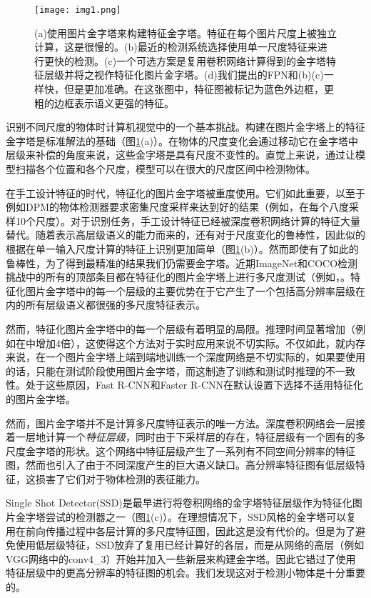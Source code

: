 \documentclass[../main.tex]{subfile}
\begin{document}
\begin{figure}[bh]
    \centering
    \texttt{[image: img1.png]}
    \caption{(a)使用图片金字塔来构建特征金字塔。特征在每个图片尺度上被独立计算，这是很慢的。(b)最近的检测系统选择使用单一尺度特征来进行更快的检测。(c)一个可选方案是复用卷积网络计算得到的金字塔特征层级并将之视作特征化图片金字塔。(d)我们提出的FPN和(b)(c)一样快，但是更加准确。在这张图中，特征图被标记为蓝色外边框，更粗的边框表示语义更强的特征。}
    \label{fig:img1}
\end{figure}


识别不同尺度的物体时计算机视觉中的一个基本挑战。构建在图片金字塔上的特征金字塔是标准解法的基础\cite{pyramid}（图\ref{fig:img1}(a)）。在物体的尺度变化会通过移动它在金字塔中层级来补偿的角度来说，这些金字塔是具有尺度不变性的。直觉上来说，通过让模型扫描各个位置和各个尺度，模型可以在很大的尺度区间中检测物体。

在手工设计特征的时代，特征化的图片金字塔被重度使用。它们如此重要，以至于例如DPM的物体检测器要求密集尺度采样来达到好的结果（例如，在每个八度采样10个尺度）。对于识别任务，手工设计特征已经被深度卷积网络计算的特征大量替代。随着表示高层级语义的能力而来的，还有对于尺度变化的鲁棒性，因此似的根据在单一输入尺度计算的特征上识别更加简单（图\ref{fig:img1}(b)）。然而即使有了如此的鲁棒性，为了得到最精准的结果我们仍需要金字塔。近期ImageNet和COCO检测挑战中的所有的顶部条目都在特征化的图片金字塔上进行多尺度测试（例如，\cite{16,35}。特征化图片金字塔中的每一个层级的主要优势在于它产生了一个包括高分辨率层级在内的所有层级语义都很强的多尺度特征表示。

然而，特征化图片金字塔中的每一个层级有着明显的局限。推理时间显著增加（例如在\cite{4}中增加4倍），这使得这个方法对于实时应用来说不切实际。不仅如此，就内存来说，在一个图片金字塔上端到端地训练一个深度网络是不切实际的，如果要使用的话，只能在测试阶段使用图片金字塔，而这制造了训练和测试时推理的不一致性。处于这些原因，Fast R-CNN和Faster R-CNN在默认设置下选择不适用特征化的图片金字塔。

然而，图片金字塔并不是计算多尺度特征表示的唯一方法。深度卷积网络会一层接着一层地计算一个\textit{特征层级}，同时由于下采样层的存在，特征层级有一个固有的多尺度金字塔的形状。这个网络中特征层级产生了一系列有不同空间分辨率的特征图，然而也引入了由于不同深度产生的巨大语义缺口。高分辨率特征图有低层级特征，这损害了它们对于物体检测的表征能力。

Single Shot Detector(SSD)是最早进行将卷积网络的金字塔特征层级作为特征化图片金字塔尝试的检测器之一（图\ref{fig:img1}(c)）。在理想情况下，SSD风格的金字塔可以复用在前向传播过程中各层计算的多尺度特征图，因此这是没有代价的。但是为了避免使用低层级特征，SSD放弃了复用已经计算好的各层，而是从网络的高层（例如VGG网络中的conv4\_3）开始并加入一些新层来构建金字塔。因此它错过了使用特征层级中的更高分辨率的特征图的机会。我们发现这对于检测小物体是十分重要的。
\end{document}
